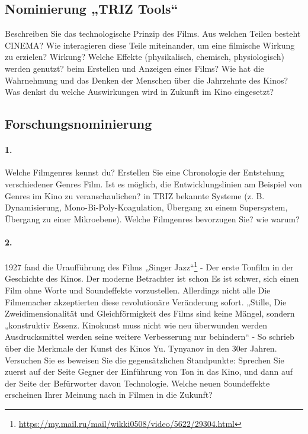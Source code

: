 \documentclass[11pt,a4paper]{article}
\begin{document}
\subsection*{Nominierung „TRIZ Tools“}

Beschreiben Sie das technologische Prinzip des Films. Aus welchen Teilen
besteht CINEMA?  Wie interagieren diese Teile miteinander, um eine filmische
Wirkung zu erzielen?  Wirkung? Welche Effekte (physikalisch, chemisch,
physiologisch) werden genutzt?  beim Erstellen und Anzeigen eines Films? Wie
hat die Wahrnehmung und das Denken der Menschen über die Jahrzehnte des Kinos?
Was denkst du welche Auswirkungen wird in Zukunft im Kino eingesetzt?

\subsection*{Forschungsnominierung}

\paragraph{1.}
Welche Filmgenres kennst du? Erstellen Sie eine Chronologie der Entstehung
verschiedener Genres Film. Ist es möglich, die Entwicklungslinien am Beispiel
von Genres im Kino zu veranschaulichen?  in TRIZ bekannte Systeme
(z. B. Dynamisierung, Mono-Bi-Poly-Koagulation, Übergang zu einem Supersystem,
Übergang zu einer Mikroebene). Welche Filmgenres bevorzugen Sie?  wie warum?

\paragraph{2.}
1927 fand die Uraufführung des Films „Singer
Jazz“\footnote{\url{https://my.mail.ru/mail/wikki0508/video/5622/29304.html}}
- Der erste Tonfilm in der Geschichte des Kinos. Der moderne Betrachter ist
schon Es ist schwer, sich einen Film ohne Worte und Soundeffekte
vorzustellen. Allerdings nicht alle Die Filmemacher akzeptierten diese
revolutionäre Veränderung sofort. „Stille, Die Zweidimensionalität und
Gleichförmigkeit des Films sind keine Mängel, sondern „konstruktiv Essenz.
Kinokunst muss nicht wie neu überwunden werden Ausdrucksmittel werden seine
weitere Verbesserung nur behindern“ - So schrieb über die Merkmale der Kunst
des Kinos Yu. Tynyanov in den 30er Jahren. Versuchen Sie es beweisen Sie die
gegensätzlichen Standpunkte: Sprechen Sie zuerst auf der Seite Gegner der
Einführung von Ton in das Kino, und dann auf der Seite der Befürworter davon
Technologie. Welche neuen Soundeffekte erscheinen Ihrer Meinung nach in Filmen
in die Zukunft?
\end{document}
